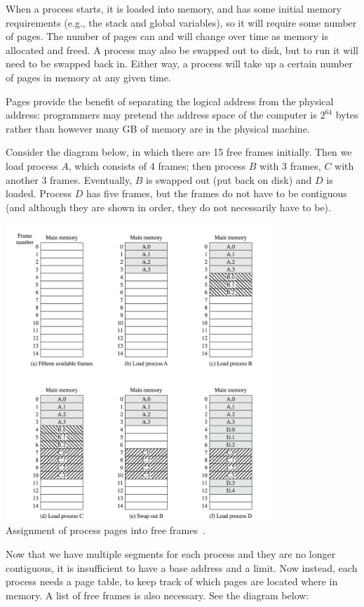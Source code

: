 When a process starts, it is loaded into memory, and has some initial memory requirements (e.g., the stack and global variables), so it will require some number of pages. The number of pages can and will change over time as memory is allocated and freed. A process may also be swapped out to disk, but to run it will need to be swapped back in. Either way, a process will take up a certain number of pages in memory at any given time.

Pages provide the benefit of separating the logical address from the physical address: programmers may pretend the address space of the computer is $2^{64}$ bytes rather than however many GB of memory are in the physical machine. 

Consider the diagram below, in which there are 15 free frames initially. Then we load process $A$, which consists of 4 frames; then process $B$ with 3 frames, $C$ with another 3 frames. Eventually, $B$ is swapped out (put back on disk) and $D$ is loaded. Process $D$ has five frames, but the frames do not have to be contiguous (and although they are shown in order, they do not necessarily have to be).

\begin{center}
\includegraphics[width=0.75\textwidth]{images/loading-pages.png}\\
Assignment of process pages into free frames~\cite{osi}.
\end{center}

Now that we have multiple segments for each process and they are no longer contiguous, it is insufficient to have a base address and a limit. Now instead, each process needs a page table, to keep track of which pages are located where in memory. A list of free frames is also necessary. See the diagram below:

